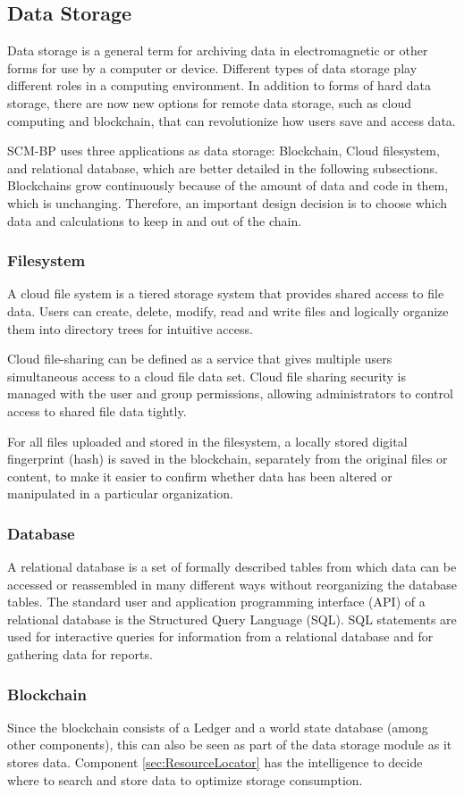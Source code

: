 \subsection{Data Storage}\label{sec:DataStorage}
Data storage is a general term for archiving data in electromagnetic or other forms for use by a computer or device. Different types of data storage play different roles in a computing environment. In addition to forms of hard data storage, there are now new options for remote data storage, such as cloud computing and blockchain, that can revolutionize how users save and access data.  

SCM-BP uses three applications as data storage: Blockchain, Cloud filesystem, and relational database, which are better detailed in the following subsections. Blockchains grow continuously because of the amount of data and code in them, which is unchanging. Therefore, an important design decision is to choose which data and calculations to keep in and out of the chain.

\subsubsection{Filesystem}\label{sec:Filesystem}
A cloud file system is a tiered storage system that provides shared access to file data. Users can create, delete, modify, read and write files and logically organize them into directory trees for intuitive access.

Cloud file-sharing can be defined as a service that gives multiple users simultaneous access to a cloud file data set. Cloud file sharing security is managed with the user and group permissions, allowing administrators to control access to shared file data tightly.

For all files uploaded and stored in the filesystem, a locally stored digital fingerprint (hash) is saved in the blockchain, separately from the original files or content, to make it easier to confirm whether data has been altered or manipulated in a particular organization.

\subsubsection{Database}\label{sec:Database}
A relational database is a set of formally described tables from which data can be accessed or reassembled in many different ways without reorganizing the database tables. The standard user and application programming interface (API) of a relational database is the Structured Query Language (SQL). SQL statements are used for interactive queries for information from a relational database and for gathering data for reports.

\subsubsection{Blockchain}\label{sec:DataStorageBlockchain}

Since the blockchain consists of a Ledger and a world state database (among other components), this can also be seen as part of the data storage module as it stores data. Component \ref{sec:ResourceLocator} has the intelligence to decide where to search and store data to optimize storage consumption.